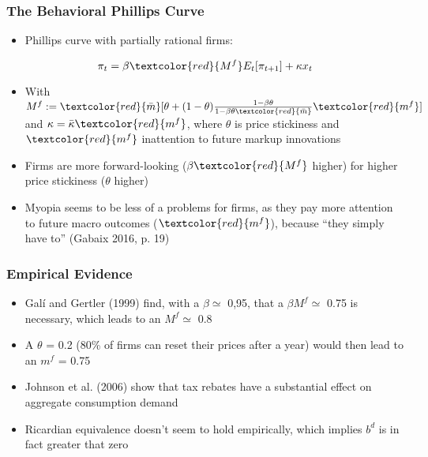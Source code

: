 \documentclass{beamer}
\begin{document}

\begin{frame}
\frametitle{The Behavioral Phillips Curve}
\begin{itemize}
\item Phillips curve with partially rational firms:
\end{itemize}
	$$\pi_{t}=\beta \textcolor{red}{M^{f}}E_{t}[\pi_{t+1}]+\kappa x_{t}$$
\begin{itemize}
\item With $M^{f}:=\textcolor{red}{\bar m}[\theta+(1-\theta)\frac{1-\beta \theta}{1-\beta \theta \textcolor{red}{\bar m}}\textcolor{red}{m^{f}}]$ and $\kappa=\bar \kappa \textcolor{red}{m^{f}}$, where $\theta$ is price stickiness and $\textcolor{red}{m^{f}}$ inattention to future markup innovations
\item Firms are more forward-looking ($\beta \textcolor{red}{ M^{f}}$ higher) for higher price stickiness ($\theta$ higher) 
\item Myopia seems to be less of a problems for firms, as they pay more attention to future macro outcomes ($\textcolor{red}{m^{f}}$),  because ``they simply have to'' (Gabaix 2016, p. 19)
\end{itemize}
\end{frame}


\begin{frame}
\frametitle{Empirical Evidence}
\begin{itemize}
\item Gal\'{i} and Gertler (1999) find, with a $\beta \simeq$ 0,95, that a $\beta M^{f}\simeq$ 0.75 is necessary, which leads to an $M^{f}\simeq$ 0.8
\item A $\theta$ = 0.2 (80\% of firms can reset their prices after a year) would then lead to an ${m^{f}}$ = 0.75
\item Johnson et al. (2006) show that tax rebates have a substantial effect on aggregate consumption demand
\item Ricardian equivalence doesn't seem to hold empirically, which implies $b^{d}$ is in fact greater that zero  
\end{itemize}
\end{frame}

\end{document}
